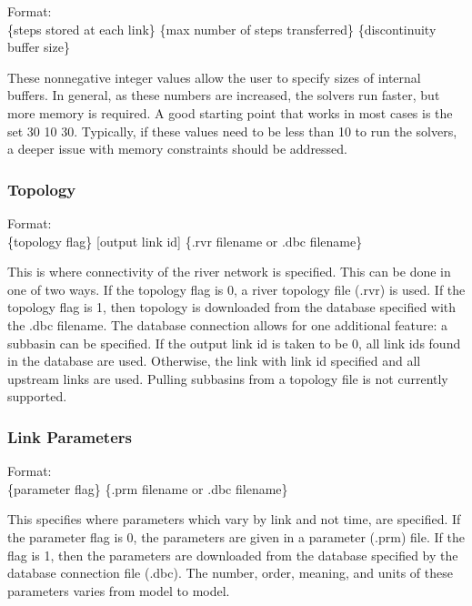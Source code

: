 \documentclass[12pt]{article}
\newenvironment{codeindent}
{\begin{list}{}
        {\setlength{\leftmargin}{.1in}}
        \item[]
}
{\end{list}}
\begin{document}
\begin{codeindent}
 Format: \\
 \{steps stored at each link\} \{max number of steps transferred\} \{discontinuity buffer size\}
\end{codeindent}

These nonnegative integer values allow the user to specify sizes of internal buffers. In general, as these numbers are increased, the solvers run faster, but more memory is required. A good starting point that works in most cases is the set 30 10 30. Typically, if these values need to be less than 10 to run the solvers, a deeper issue with memory constraints should be addressed.

\subsubsection{Topology} \label{sec: topology}

\begin{codeindent}
 Format: \\
 \{topology flag\} [output link id] \{.rvr filename or .dbc filename\}
\end{codeindent}

This is where connectivity of the river network is specified. This can be done in one of two ways. If the topology flag is 0, a river topology file (.rvr) is used. If the topology flag is 1, then topology is downloaded from the database specified with the .dbc filename. The database connection allows for one additional feature: a subbasin can be specified. If the output link id is taken to be 0, all link ids found in the database are used. Otherwise, the link with link id specified and all upstream links are used. Pulling subbasins from a topology file is not currently supported.

\subsubsection{Link Parameters} \label{sec: link parameters}

\begin{codeindent}
 Format: \\
 \{parameter flag\} \{.prm filename or .dbc filename\}
\end{codeindent}

This specifies where parameters which vary by link and not time, are specified. If the parameter flag is 0, the parameters are given in a parameter (.prm) file. If the flag is 1, then the parameters are downloaded from the database specified by the database connection file (.dbc). The number, order, meaning, and units of these parameters varies from model to model.
\end{document}
